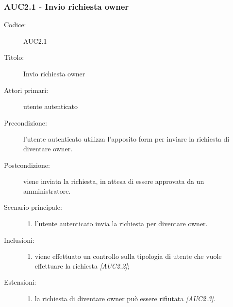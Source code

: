 \documentclass[../../../analisi-dei-requisiti.tex]{subfiles}
\begin{document}
\subsubsection{AUC2.1 - Invio richiesta owner}%
\label{subs:AUC2.1}
\begin{description}
  \item[Codice:] AUC2.1
  \item[Titolo:] Invio richiesta owner
  \item[Attori primari:] utente autenticato
  \item[Precondizione:] l'utente autenticato utilizza l'apposito form per inviare la richiesta di diventare owner.
  \item[Postcondizione:] viene inviata la richiesta, in attesa di essere approvata da un amministratore.
  \item[Scenario principale:]
  \begin{enumerate}
    \item l'utente autenticato invia la richiesta per diventare owner.
  \end{enumerate}
  \item[Inclusioni:]
  \begin{enumerate}
    \item viene effettuato un controllo sulla tipologia di utente che vuole effettuare la richiesta \emph{[AUC2.2]};
  \end{enumerate}
  \item[Estensioni:]
  \begin{enumerate}
    \item la richiesta di diventare owner può essere rifiutata \emph{[AUC2.3]}.
  \end{enumerate}
\end{description}
\end{document}
